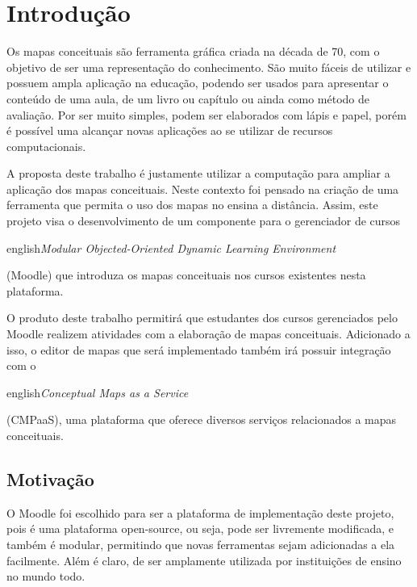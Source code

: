 \documentclass[
	12pt,				%
	openright,			%
	oneside,			%
	a4paper,			%
	english,			%
	french,				%
	spanish,			%
	brazil				%
	]{abntex2}
\begin{document}
\chapter{Introdução}

Os mapas conceituais são ferramenta gráfica criada na década de 70, com o objetivo de ser uma representação do conhecimento. São muito fáceis de utilizar e possuem ampla aplicação na educação, podendo ser usados para apresentar o conteúdo de uma aula, de um livro ou capítulo ou ainda como método de avaliação. Por ser muito simples, podem ser elaborados com lápis e papel, porém é possível uma alcançar novas aplicações ao se utilizar de recursos computacionais.

A proposta deste trabalho é justamente utilizar a computação para ampliar a aplicação dos mapas conceituais. Neste contexto foi pensado na criação de uma ferramenta que permita o uso dos mapas no ensina a distância. Assim, este projeto visa o desenvolvimento de um componente para o gerenciador de cursos \begin{otherlanguage*}{english}\textit{Modular Objected-Oriented Dynamic Learning Environment}\end{otherlanguage*} (Moodle) que introduza os mapas conceituais nos cursos existentes nesta plataforma. 

O produto deste trabalho permitirá que estudantes dos cursos gerenciados pelo Moodle realizem atividades com a elaboração de mapas conceituais. Adicionado a isso, o editor de mapas que será implementado também irá possuir integração com o \begin{otherlanguage*}{english}\textit{Conceptual Maps as a Service}\end{otherlanguage*}  (CMPaaS), uma plataforma que oferece diversos serviços relacionados a mapas conceituais.

\section{Motivação}

O Moodle foi escolhido para ser a plataforma de implementação deste projeto, pois é uma plataforma open-source, ou seja, pode ser livremente modificada, e também é modular, permitindo que novas ferramentas sejam adicionadas a ela facilmente. Além é claro, de ser amplamente utilizada por instituições de ensino no mundo todo.
\end{document}
